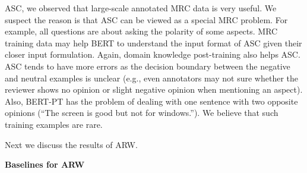 ASC, we observed that large-scale annotated MRC data is very useful.
We suspect the reason is that ASC can be viewed as a special MRC problem. For example, all questions are about asking the polarity of some aspects.
MRC training data may help BERT to understand the input format of ASC given their closer input formulation.
Again, domain knowledge post-training also helps ASC.
ASC tends to have more errors as the decision boundary between the negative and neutral examples is unclear (e.g., even annotators may not sure whether the reviewer shows no opinion or slight negative opinion when mentioning an aspect).
Also, BERT-PT has the problem of dealing with one sentence with two opposite opinions (``The screen is good but not for windows.''). We believe that such training examples are rare.

Next we discuss the results of ARW.

\textbf{Baselines for ARW}
\label{chap6:sec:baselines}

